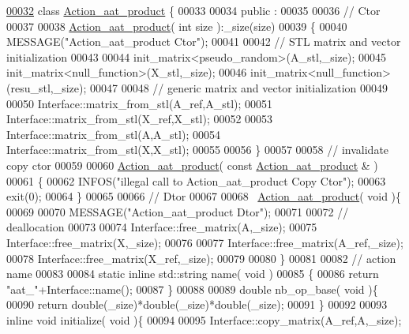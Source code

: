 \begin{DoxyCode}
\hyperlink{class_action__aat__product}{00032} \textcolor{keyword}{class }\hyperlink{class_action__aat__product}{Action\_aat\_product} \{
00033 
00034 public :
00035 
00036   \textcolor{comment}{// Ctor}
00037 
00038   \hyperlink{class_action__aat__product}{Action\_aat\_product}( \textcolor{keywordtype}{int} size ):\_size(size)
00039   \{
00040     MESSAGE(\textcolor{stringliteral}{"Action\_aat\_product Ctor"});
00041 
00042     \textcolor{comment}{// STL matrix and vector initialization}
00043 
00044     init\_matrix<pseudo\_random>(A\_stl,\_size);
00045     init\_matrix<null\_function>(X\_stl,\_size);
00046     init\_matrix<null\_function>(resu\_stl,\_size);
00047 
00048     \textcolor{comment}{// generic matrix and vector initialization}
00049 
00050     Interface::matrix\_from\_stl(A\_ref,A\_stl);
00051     Interface::matrix\_from\_stl(X\_ref,X\_stl);
00052 
00053     Interface::matrix\_from\_stl(A,A\_stl);
00054     Interface::matrix\_from\_stl(X,X\_stl);
00055 
00056   \}
00057 
00058   \textcolor{comment}{// invalidate copy ctor}
00059 
00060   \hyperlink{class_action__aat__product}{Action\_aat\_product}( \textcolor{keyword}{const}  \hyperlink{class_action__aat__product}{Action\_aat\_product} & )
00061   \{
00062     INFOS(\textcolor{stringliteral}{"illegal call to Action\_aat\_product Copy Ctor"});
00063     exit(0);
00064   \}
00065 
00066   \textcolor{comment}{// Dtor}
00067 
00068   ~\hyperlink{class_action__aat__product}{Action\_aat\_product}( \textcolor{keywordtype}{void} )\{
00069 
00070     MESSAGE(\textcolor{stringliteral}{"Action\_aat\_product Dtor"});
00071 
00072     \textcolor{comment}{// deallocation}
00073 
00074     Interface::free\_matrix(A,\_size);
00075     Interface::free\_matrix(X,\_size);
00076 
00077     Interface::free\_matrix(A\_ref,\_size);
00078     Interface::free\_matrix(X\_ref,\_size);
00079 
00080   \}
00081 
00082   \textcolor{comment}{// action name}
00083 
00084   \textcolor{keyword}{static} \textcolor{keyword}{inline} std::string name( \textcolor{keywordtype}{void} )
00085   \{
00086     \textcolor{keywordflow}{return} \textcolor{stringliteral}{"aat\_"}+Interface::name();
00087   \}
00088 
00089   \textcolor{keywordtype}{double} nb\_op\_base( \textcolor{keywordtype}{void} )\{
00090     \textcolor{keywordflow}{return} double(\_size)*double(\_size)*double(\_size);
00091   \}
00092 
00093   \textcolor{keyword}{inline} \textcolor{keywordtype}{void} initialize( \textcolor{keywordtype}{void} )\{
00094 
00095     Interface::copy\_matrix(A\_ref,A,\_size);

\end{DoxyCode}
